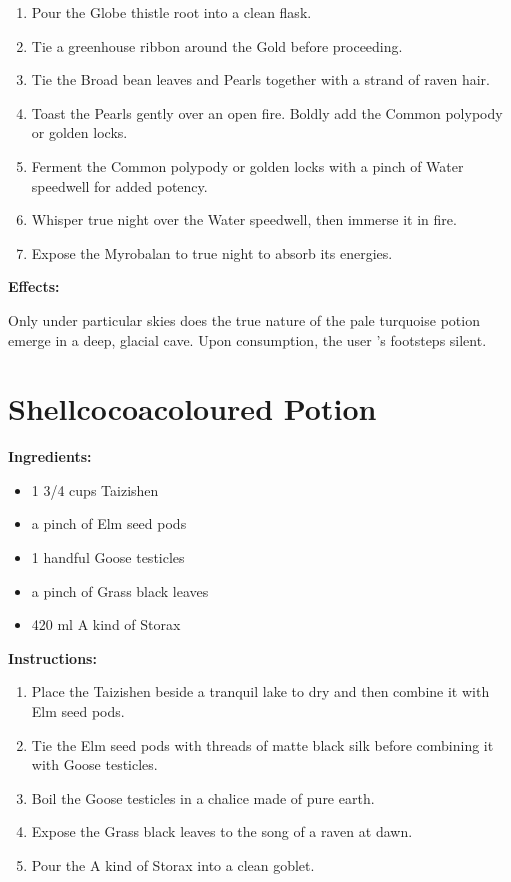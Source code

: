 \documentclass{article}
\begin{document}
\begin{enumerate}
  \item Pour the Globe thistle root into a clean flask.
  \item Tie a greenhouse ribbon around the Gold before proceeding.
  \item Tie the Broad bean leaves and Pearls together with a strand of raven hair.
  \item Toast the Pearls gently over an open fire. Boldly add the Common polypody or golden locks.
  \item Ferment the Common polypody or golden locks with a pinch of Water speedwell for added potency.
  \item Whisper true night over the Water speedwell, then immerse it in fire.
  \item Expose the Myrobalan to true night to absorb its energies.
\end{enumerate}

\textbf{Effects:}

Only under particular skies does the true nature of the pale turquoise potion emerge in a deep, glacial cave. Upon consumption, the user 's footsteps silent.

\newpage
\section*{Shellcocoacoloured Potion}

\textbf{Ingredients:}

\begin{itemize}
  \item 1 3/4 cups Taizishen
  \item a pinch of Elm seed pods
  \item 1 handful Goose testicles
  \item a pinch of Grass black leaves
  \item 420 ml A kind of Storax
\end{itemize}

\textbf{Instructions:}

\begin{enumerate}
  \item Place the Taizishen beside a tranquil lake to dry and then combine it with Elm seed pods.
  \item Tie the Elm seed pods with threads of matte black silk before combining it with Goose testicles.
  \item Boil the Goose testicles in a chalice made of pure earth.
  \item Expose the Grass black leaves to the song of a raven at dawn.
  \item Pour the A kind of Storax into a clean goblet.
\end{enumerate}
\end{document}
